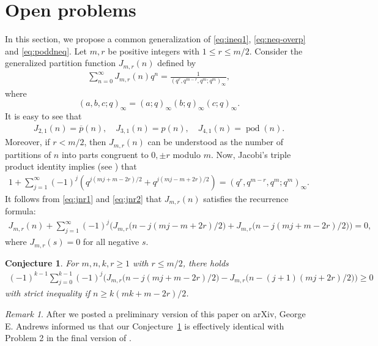 \documentclass[12pt]{article}
\newtheorem{conj}[thm]{Conjecture}
\theoremstyle{remark}
\newtheorem{remark}[thm]{Remark}
\DeclareMathOperator{\podd}{pod}
\numberwithin{equation}{section}
\begin{document}
\section{Open problems}
In this section,
we propose a common   generalization  of \eqref{eq:ineq1}, \eqref{eq:neq-overp} and \eqref{eq:poddneq}.
Let $m,r$ be positive integers with $1\leqslant r\leqslant m/2$.
Consider
the generalized partition function $J_{m,r}(n)$ defined by
\begin{align}
\sum_{n=0}^\infty J_{m,r}(n) q^n=\frac{1}{(q^{r}, q^{m-r}, q^m;q^m)_\infty},\label{eq:jnr1}
\end{align}
where
$$
(a,b,c;q)_\infty=(a;q)_\infty(b;q)_\infty(c;q)_\infty.
$$
It is easy to see that
\begin{align*}
J_{2,1}(n)=\overline{p}(n),\quad
J_{3,1}(n)=p(n), \quad
J_{4,1}(n)=\podd (n).
\end{align*}
Moreover, if $r<m/2$, then $J_{m,r}(n)$ can be understood as the number of partitions of $n$ into parts
congruent to $0,\pm r$ modulo $m$. Now,
Jacobi's triple product identity implies (see \cite[p.~375]{HW}) that
\begin{align}
1+\sum_{j=1}^\infty (-1)^j (q^{j(mj+m-2r)/2}+q^{j(mj-m+2r)/2})=(q^{r}, q^{m-r}, q^m;q^m)_\infty \label{eq:jnr2}.
\end{align}
It follows from \eqref{eq:jnr1} and \eqref{eq:jnr2} that $J_{m,r}(n)$ satisfies the recurrence formula:
\begin{align*}%
J_{m,r}(n)+\sum_{j=1}^{\infty} (-1)^{j}\Big(J_{m,r}\big(n-j(mj-m+2r)/2\big)
+J_{m,r}\big(n-j(mj+m-2r)/2\big)\Big)= 0,
\end{align*}
where $J_{m,r}(s)=0$ for all negative $s$.


\begin{conj}\label{conj:main}
For $m,n,k,r\geqslant 1$ with $r\leqslant  m/2$, there holds
\begin{align}
(-1)^{k-1}\sum_{j=0}^{k-1} (-1)^{j}\Big(J_{m,r}\big(n-j(mj+m-2r)/2\big)
-J_{m,r}\big(n-(j+1)(mj+2r)/2\big)\Big)
\geqslant 0 \label{eq:conjlast}
\end{align}
with strict inequality if $n\geqslant k(mk+m-2r)/2$.
\end{conj}


\begin{remark}
After we posted a preliminary version of this paper on arXiv, George E. Andrews  informed us that
our  Conjecture~\ref{conj:main} is effectively identical with Problem 2 in the final version of \cite{AM}.
\end{remark}
\end{document}
